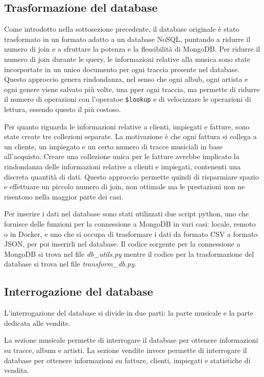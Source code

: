 \documentclass{article}
\begin{document}
\subsection{Trasformazione del database}

Come introdotto nella sottosezione precedente, il database originale è stato trasformato in un formato adatto
a un database NoSQL, puntando a ridurre il numero di join e a sfruttare la potenza e la flessibilità di MongoDB.
Per ridurre il numero di join durante le query, le informazioni relative alla musica sono state incorportate in un unico documento per ogni traccia
presente nel database. Questo approccio genera rindondanza, nel senso che ogni albub, ogni artista e ogni genere viene salvato
più volte, una pper ogni traccia, ma permette di ridurre il numero di operazioni con l'operatoe \texttt{\$lookup} e di velocizzare le operazioni di lettura, essendo questo il più costoso.

Per quanto riguarda le informazioni relative a clienti, impiegati e fatture, sono state create tre collezioni separate. La motivazione è che ogni fattura si collega a un cliente, un impiegato e un certo numero di tracce musiciali
in base all'acquisto. Creare una collezione unica per le fatture avrebbe implicato la rindondanza delle informazioni relative a clienti e impiegati, contenenti una discreta quantità di dati. Questo approccio permette quindi 
di risparmiare spazio e effettuare un piccolo numero di join, non ottimale ma le prestazioni non ne risentono nella maggior parte dei casi.

Per inserire i dati nel database sono stati utilizzati due script python, uno che fornisce delle funzioni per la connessione a MongoDB in vari casi: locale, remoto o in Docker, e uno che si occupa di trasformare i dati 
da formato CSV a formato JSON, per poi inserirli nel database. Il codice sorgente per la connessione a MongoDB si trova nel file \textit{db\_utils.py} mentre il codice per la trasformazione del database si trova nel file
\textit{transform\_db.py}. 

\subsection{Interrogazione del database}

L'interrogazione del database si divide in due parti: la parte musicale e la parte dedicata alle vendite.

La sezione musicale permette di interrogare il database per ottenere informazioni su tracce, album e artisti. La sezione vendite invece
permette di interrogare il database per ottenere informazioni su fatture, clienti, impiegati e statistiche di vendita.
\end{document}
